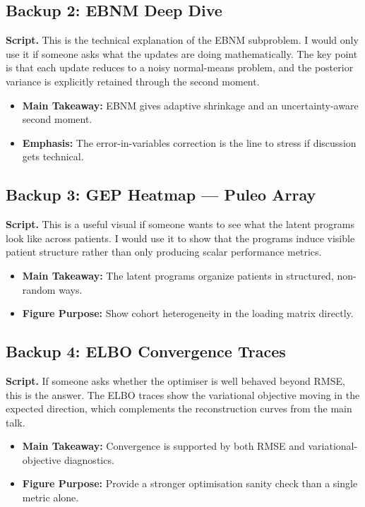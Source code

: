 \documentclass[11pt]{article}
\newcommand{\scriptlabel}{\textbf{Script. }}
\newcommand{\sectionlabel}[1]{\textbf{#1}}
\begin{document}
\subsection*{Backup 2: EBNM Deep Dive}
\scriptlabel This is the technical explanation of the EBNM subproblem. I would only use it if someone asks what the updates are doing mathematically. The key point is that each update reduces to a noisy normal-means problem, and the posterior variance is explicitly retained through the second moment.

\begin{itemize}
\item \sectionlabel{Main Takeaway:} EBNM gives adaptive shrinkage and an uncertainty-aware second moment.
\item \sectionlabel{Emphasis:} The error-in-variables correction is the line to stress if discussion gets technical.
\end{itemize}

\subsection*{Backup 3: GEP Heatmap --- Puleo Array}
\scriptlabel This is a useful visual if someone wants to see what the latent programs look like across patients. I would use it to show that the programs induce visible patient structure rather than only producing scalar performance metrics.

\begin{itemize}
\item \sectionlabel{Main Takeaway:} The latent programs organize patients in structured, non-random ways.
\item \sectionlabel{Figure Purpose:} Show cohort heterogeneity in the loading matrix directly.
\end{itemize}

\subsection*{Backup 4: ELBO Convergence Traces}
\scriptlabel If someone asks whether the optimiser is well behaved beyond RMSE, this is the answer. The ELBO traces show the variational objective moving in the expected direction, which complements the reconstruction curves from the main talk.

\begin{itemize}
\item \sectionlabel{Main Takeaway:} Convergence is supported by both RMSE and variational-objective diagnostics.
\item \sectionlabel{Figure Purpose:} Provide a stronger optimisation sanity check than a single metric alone.
\end{itemize}
\end{document}
